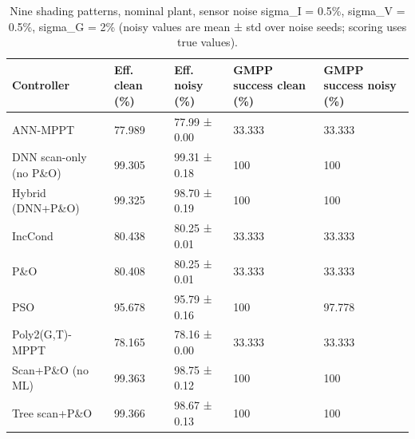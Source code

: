 \begin{table}[t]
\centering
\caption{Nine shading patterns, nominal plant, sensor noise sigma\_I = 0.5\%, sigma\_V = 0.5\%, sigma\_G = 2\% (noisy values are mean ± std over noise seeds; scoring uses true values).}
\label{tab:Table_Noise}
\small
\begin{tabular}{lllll}
\hline
Controller & Eff. clean (\%) & Eff. noisy (\%) & GMPP success clean (\%) & GMPP success noisy (\%) \\
\hline
ANN-MPPT & 77.989 & 77.99 ± 0.00 & 33.333 & 33.333 \\
DNN scan-only (no P\&O) & 99.305 & 99.31 ± 0.18 & 100 & 100 \\
Hybrid (DNN+P\&O) & 99.325 & 98.70 ± 0.19 & 100 & 100 \\
IncCond & 80.438 & 80.25 ± 0.01 & 33.333 & 33.333 \\
P\&O & 80.408 & 80.25 ± 0.01 & 33.333 & 33.333 \\
PSO & 95.678 & 95.79 ± 0.16 & 100 & 97.778 \\
Poly2(G,T)-MPPT & 78.165 & 78.16 ± 0.00 & 33.333 & 33.333 \\
Scan+P\&O (no ML) & 99.363 & 98.75 ± 0.12 & 100 & 100 \\
Tree scan+P\&O & 99.366 & 98.67 ± 0.13 & 100 & 100 \\
\hline
\end{tabular}
\end{table}
